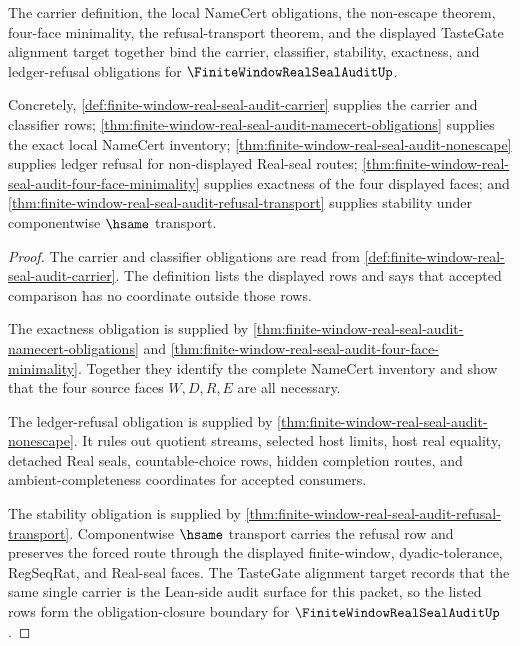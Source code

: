 \begin{theorem}
\label{thm:finite-window-real-seal-audit-obligation-closure}
The carrier definition, the local NameCert obligations, the non-escape theorem, four-face minimality, the refusal-transport theorem, and the displayed TasteGate alignment target together bind the carrier, classifier, stability, exactness, and ledger-refusal obligations for $\FiniteWindowRealSealAuditUp$.

Concretely, \autoref{def:finite-window-real-seal-audit-carrier} supplies the carrier and classifier rows; \autoref{thm:finite-window-real-seal-audit-namecert-obligations} supplies the exact local NameCert inventory; \autoref{thm:finite-window-real-seal-audit-nonescape} supplies ledger refusal for non-displayed Real-seal routes; \autoref{thm:finite-window-real-seal-audit-four-face-minimality} supplies exactness of the four displayed faces; and \autoref{thm:finite-window-real-seal-audit-refusal-transport} supplies stability under componentwise $\hsame$ transport.
\end{theorem}
\begin{proof}
The carrier and classifier obligations are read from \autoref{def:finite-window-real-seal-audit-carrier}. The definition lists the displayed rows and says that accepted comparison has no coordinate outside those rows.

The exactness obligation is supplied by \autoref{thm:finite-window-real-seal-audit-namecert-obligations} and \autoref{thm:finite-window-real-seal-audit-four-face-minimality}. Together they identify the complete NameCert inventory and show that the four source faces $W,D,R,E$ are all necessary.

The ledger-refusal obligation is supplied by \autoref{thm:finite-window-real-seal-audit-nonescape}. It rules out quotient streams, selected host limits, host real equality, detached Real seals, countable-choice rows, hidden completion routes, and ambient-completeness coordinates for accepted consumers.

The stability obligation is supplied by \autoref{thm:finite-window-real-seal-audit-refusal-transport}. Componentwise $\hsame$ transport carries the refusal row and preserves the forced route through the displayed finite-window, dyadic-tolerance, RegSeqRat, and Real-seal faces. The TasteGate alignment target records that the same single carrier is the Lean-side audit surface for this packet, so the listed rows form the obligation-closure boundary for $\FiniteWindowRealSealAuditUp$.
\end{proof}


